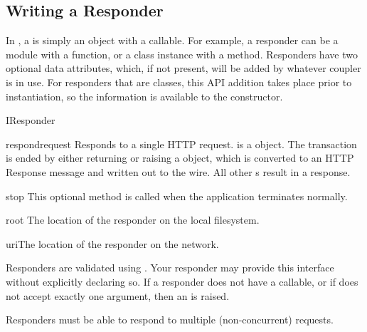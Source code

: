 \subsection{Writing a Responder \label{iresponder}}

In , a  is simply an object with a
 callable. For example, a responder can be a module with a
 function, or a class instance with a  method.
Responders have two optional data attributes, which, if not present, will be
added by whatever coupler is in use. For responders that are classes, this API
addition takes place prior to instantiation, so the information is available to
the constructor.

\begin{classdesc*}{IResponder}

\begin{funcdesc}{respond}{request} Responds to a single HTTP request.
 is a  object. The transaction is ended by either
returning or raising a  object, which is converted to an HTTP
Response message and written out to the wire. All other s
result in a 
response.\end{funcdesc}

\begin{funcdesc}{stop}{} This optional method is called when the application
terminates normally. \end{funcdesc}

\begin{datadesc}{root} The location of the responder on the local
filesystem.\end{datadesc}

\begin{datadesc}{uri}The location of the responder on the network.\end{datadesc}

\end{classdesc*}

Responders are validated using . Your responder may
provide this interface without explicitly declaring so. If a responder does not
have a  callable, or if  does not accept
exactly one argument, then an  is raised.

Responders must be able to respond to multiple (non-concurrent) requests.


